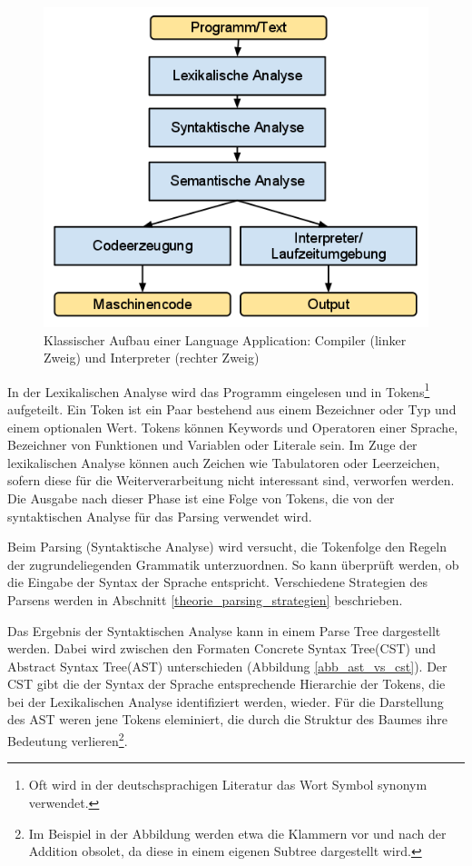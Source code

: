 \begin{figure}[h]
\includegraphics[width=\textwidth,scale=0.5]{figures/language_application_klassisch.png}
\caption{Klassischer Aufbau einer Language Application: Compiler (linker Zweig) und Interpreter (rechter Zweig)}
\label{abb_language_application_klassisch}
\end{figure}

In der Lexikalischen Analyse wird das Programm eingelesen und in Tokens\footnote{Oft wird in der deutschsprachigen Literatur das Wort Symbol synonym verwendet.} aufgeteilt. Ein Token ist ein Paar bestehend aus einem Bezeichner oder Typ und einem optionalen Wert\cite[S. 111ff]{AhSe86}. Tokens können Keywords und Operatoren einer Sprache, Bezeichner von Funktionen und Variablen oder Literale sein. Im Zuge der lexikalischen Analyse können auch Zeichen wie Tabulatoren oder Leerzeichen, sofern diese für die Weiterverarbeitung nicht interessant sind, verworfen werden. Die Ausgabe nach dieser Phase ist eine Folge von Tokens, die von der syntaktischen Analyse für das Parsing verwendet wird.

Beim Parsing (Syntaktische Analyse) wird versucht, die Tokenfolge den Regeln der zugrundeliegenden Grammatik unterzuordnen. So kann überprüft werden, ob die Eingabe der Syntax der Sprache entspricht. Verschiedene Strategien des Parsens werden in Abschnitt \ref{theorie_parsing_strategien} beschrieben. 

Das Ergebnis der Syntaktischen Analyse kann in einem Parse Tree dargestellt werden. Dabei wird zwischen den Formaten Concrete Syntax Tree(CST) und Abstract Syntax Tree(AST) unterschieden (Abbildung \ref{abb_ast_vs_cst}). Der CST gibt die der Syntax der Sprache entsprechende Hierarchie der Tokens, die bei der Lexikalischen Analyse identifiziert werden, wieder. Für die Darstellung des AST weren jene Tokens eleminiert, die durch die Struktur des Baumes ihre Bedeutung verlieren\footnote{Im Beispiel in der Abbildung werden etwa die Klammern vor und nach der Addition obsolet, da diese in einem eigenen Subtree dargestellt wird.}.  

